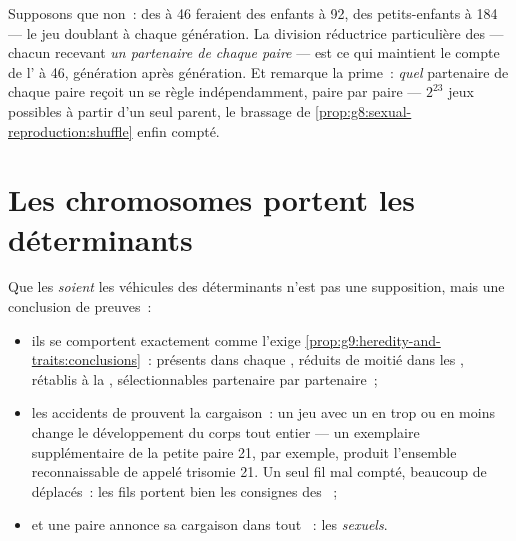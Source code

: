 \begin{remark}\label{rem:g9:chromosomes:whyhalve}
Supposons que non~: des  à 46  feraient
des enfants à 92, des petits-enfants à 184 --- le jeu
doublant à chaque génération. La division réductrice
particulière des  --- chacun recevant \emph{un
partenaire de chaque paire} --- est ce qui maintient le
compte de l' à 46, génération après génération. Et
remarque la prime~: \emph{quel} partenaire de chaque paire
reçoit un  se règle indépendamment, paire par paire
--- $2^{23}$ jeux possibles à partir d'un seul parent, le
brassage de \cref{prop:g8:sexual-reproduction:shuffle}
enfin compté.
\end{remark}

\section{Les chromosomes portent les déterminants}

\begin{proposition}\label{prop:g9:chromosomes:evidence}
Que les  \emph{soient} les véhicules des
déterminants n'est pas une supposition, mais une conclusion
de preuves~:
\begin{itemize}
  \item ils se comportent exactement comme l'exige
        \cref{prop:g9:heredity-and-traits:conclusions}~:
        présents dans chaque , réduits de moitié
        dans les , rétablis à la ,
        sélectionnables partenaire par partenaire~;
  \item les accidents de  prouvent la cargaison~:
        un jeu avec un  en trop ou en moins
        change le développement du corps tout entier ---
        un exemplaire supplémentaire de la petite paire 21,
        par exemple, produit l'ensemble reconnaissable de
         appelé trisomie 21. Un seul fil mal
        compté, beaucoup de  déplacés~: les fils
        portent bien les consignes des ~;
  \item et une paire annonce sa cargaison dans tout
        ~: les \emph{ sexuels}.
\end{itemize}
\end{proposition}
\admitted

